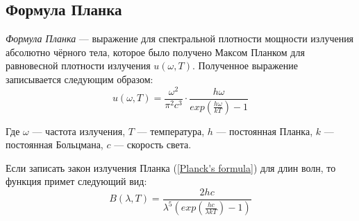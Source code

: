 \subsection{Формула Планка}

\textit{Формула Планка} --- выражение для спектральной плотности мощности излучения абсолютно чёрного тела, которое было получено Максом Планком для равновесной плотности излучения $u(\omega,T)$. Полученное выражение записывается следующим образом:
\begin{equation}\label{Planck's formula}
u(\omega,T)=\frac{\omega^2}{\pi^2c^3}\cdot \frac{h\omega}{exp\left(\frac{h\omega}{kT}\right)-1}
\end{equation}

Где $\omega$ --- частота излучения, $T$ --- температура, $h$ --- постоянная Планка, $k$ --- постоянная Больцмана, $c$ --- скорость света.

Если записать закон излучения Планка (\ref{Planck's formula}) для длин волн, то функция примет следующий вид:
\begin{equation}\label{Planck's formula2}
B(\lambda,T)=\frac{2hc}{\lambda^5 \left(exp\left(\frac{hc}{\lambda kT}\right)-1\right)}
\end{equation}